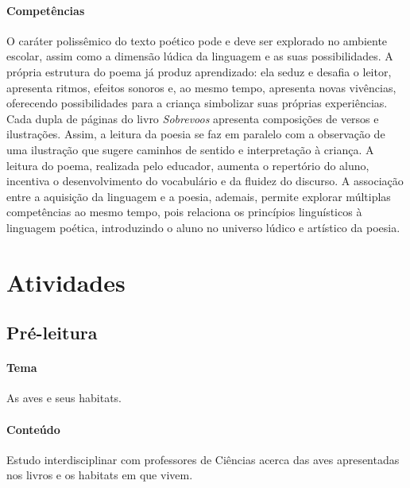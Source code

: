 \documentclass[11pt]{extarticle}
\begin{document}
\paragraph{Competências} 
O caráter polissêmico do texto poético pode e deve ser explorado no ambiente escolar, assim como a dimensão lúdica da linguagem e as suas possibilidades. A própria estrutura do poema já produz aprendizado: ela seduz e desafia o leitor, apresenta ritmos, efeitos sonoros e, ao mesmo tempo, apresenta novas vivências, oferecendo possibilidades para a criança simbolizar suas próprias experiências. Cada dupla de páginas do livro \textit{Sobrevoos} apresenta composições de versos e ilustrações. Assim, a leitura da poesia se faz em paralelo com a observação de uma ilustração que sugere caminhos de sentido e interpretação à criança. A leitura do poema, realizada pelo educador, aumenta o repertório do aluno, incentiva o desenvolvimento do vocabulário e da fluidez do discurso. A associação entre a aquisição da linguagem e a poesia, ademais, permite explorar múltiplas competências ao mesmo tempo, pois relaciona os princípios linguísticos à linguagem poética, introduzindo o aluno no universo lúdico e artístico da poesia.

\section{Atividades}

\subsection{Pré-leitura}


\paragraph{Tema} As aves e seus habitats.

\paragraph{Conteúdo} Estudo interdisciplinar com professores de Ciências acerca das aves apresentadas nos livros e os habitats em que vivem.
\end{document}
